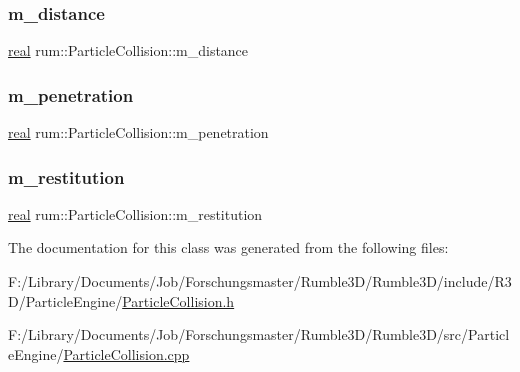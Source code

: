 \subsubsection{\texorpdfstring{m\+\_\+distance}{m\_distance}}
{\footnotesize\ttfamily \hyperlink{namespacerum_a7e8cca23573d5eaead0f138cbaa4862c}{real} rum\+::\+Particle\+Collision\+::m\+\_\+distance\hspace{0.3cm}{\ttfamily [protected]}}

\mbox{\label{classrum_1_1_particle_collision_a9ad398fd1a7b78e8ae8083610be60abb}} 
\subsubsection{\texorpdfstring{m\+\_\+penetration}{m\_penetration}}
{\footnotesize\ttfamily \hyperlink{namespacerum_a7e8cca23573d5eaead0f138cbaa4862c}{real} rum\+::\+Particle\+Collision\+::m\+\_\+penetration\hspace{0.3cm}{\ttfamily [protected]}}

\mbox{\label{classrum_1_1_particle_collision_ae7aca9af657f5aea5e5e8c1261a51569}} 
\subsubsection{\texorpdfstring{m\+\_\+restitution}{m\_restitution}}
{\footnotesize\ttfamily \hyperlink{namespacerum_a7e8cca23573d5eaead0f138cbaa4862c}{real} rum\+::\+Particle\+Collision\+::m\+\_\+restitution\hspace{0.3cm}{\ttfamily [protected]}}



The documentation for this class was generated from the following files\+:\begin{DoxyCompactItemize}
\item 
F\+:/\+Library/\+Documents/\+Job/\+Forschungsmaster/\+Rumble3\+D/\+Rumble3\+D/include/\+R3\+D/\+Particle\+Engine/\hyperlink{_particle_collision_8h}{Particle\+Collision.\+h}\item 
F\+:/\+Library/\+Documents/\+Job/\+Forschungsmaster/\+Rumble3\+D/\+Rumble3\+D/src/\+Particle\+Engine/\hyperlink{_particle_collision_8cpp}{Particle\+Collision.\+cpp}\end{DoxyCompactItemize}
